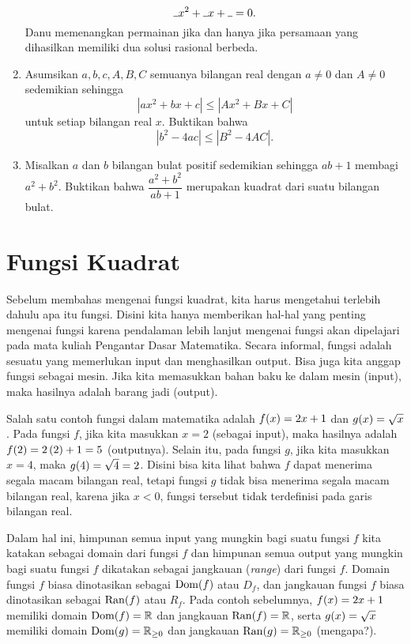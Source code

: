 \begin{enumerate}[nosep]
			\[ \rule{1ex}{.4pt}x^{2} + \rule{1ex}{.4pt}x + \rule{1ex}{.4pt} = 0. \]
			Danu memenangkan permainan jika dan hanya jika persamaan yang dihasilkan memiliki dua solusi rasional berbeda.
			\item {} \probtype{**} Asumsikan $ a, b, c, A, B, C $ semuanya bilangan real dengan $ a \ne 0 $ dan $ A \ne 0 $ sedemikian sehingga
			\[ \left|ax^{2} + bx + c\right| \leq \left|Ax^{2} + Bx + C\right| \]
			untuk setiap bilangan real $ x $. Buktikan bahwa
			\[ \left|b^{2} - 4ac\right| \leq \left|B^{2} - 4AC\right|. \]
			\item {} \probtype{**} Misalkan $ a $ dan $ b $ bilangan bulat positif sedemikian sehingga $ ab + 1 $ membagi $ a^{2} + b^{2} $. Buktikan bahwa $ \dfrac{a^{2} + b^{2}}{ab + 1} $ merupakan kuadrat dari suatu bilangan bulat.
		\end{enumerate}

\newpage


\section{Fungsi Kuadrat}

Sebelum membahas mengenai fungsi kuadrat, kita harus mengetahui terlebih dahulu apa itu fungsi. Disini kita hanya memberikan hal-hal yang penting mengenai fungsi karena pendalaman lebih lanjut mengenai fungsi akan dipelajari pada mata kuliah Pengantar Dasar Matematika. Secara informal, fungsi adalah sesuatu yang memerlukan input dan menghasilkan output. Bisa juga kita anggap fungsi sebagai mesin. Jika kita memasukkan bahan baku ke dalam mesin (input), maka hasilnya adalah barang jadi (output).

\par Salah satu contoh fungsi dalam matematika adalah $ \mathop{}\!{f}{\left({x}\right)} = 2x + 1 $ dan $ \mathop{}\!{g}{\left({x}\right)} = \sqrt{x} $. Pada fungsi $ f $, jika kita masukkan $ x = 2 $ (sebagai input), maka hasilnya adalah $ \mathop{}\!{f}{\left({2}\right)} = 2\left(2\right) + 1 = 5 $ (outputnya). Selain itu, pada fungsi $ g $, jika kita masukkan $ x = 4 $, maka $ \mathop{}\!{g}{\left({4}\right)} = \sqrt{4} = 2 $. Disini bisa kita lihat bahwa $ f $ dapat menerima segala macam bilangan real, tetapi fungsi $ g $ tidak bisa menerima segala macam bilangan real, karena jika $ x < 0 $, fungsi tersebut tidak terdefinisi pada garis bilangan real.

\par Dalam hal ini, himpunan semua input yang mungkin bagi suatu fungsi $ f $ kita katakan sebagai domain dari fungsi $ f $ dan himpunan semua output yang mungkin bagi suatu fungsi $ f $ dikatakan sebagai jangkauan (\textit{range}) dari fungsi $ f $. Domain fungsi $ f $ biasa dinotasikan sebagai $ \mathop{}\!{\operatorname{Dom}}{\left({f}\right)} $ atau $ D_{f} $, dan jangkauan fungsi $ f $ biasa dinotasikan sebagai $ \mathop{}\!{\operatorname{Ran}}{\left({f}\right)} $ atau $ R_{f} $. Pada contoh sebelumnya, $ \mathop{}\!{f}{\left({x}\right)} = 2x + 1 $ memiliki domain $ \mathop{}\!{\operatorname{Dom}}{\left({f}\right)} = \mathbb{R} $ dan jangkauan $ \mathop{}\!{\operatorname{Ran}}{\left({f}\right)} = \mathbb{R} $, serta $ \mathop{}\!{g}{\left({x}\right)} = \sqrt{x} $ memiliki domain $ \mathop{}\!{\operatorname{Dom}}{\left({g}\right)} = \mathbb{R}_{\geq 0} $ dan jangkauan $ \mathop{}\!{\operatorname{Ran}}{\left({g}\right)} = \mathbb{R}_{\geq 0} $ (mengapa?).

